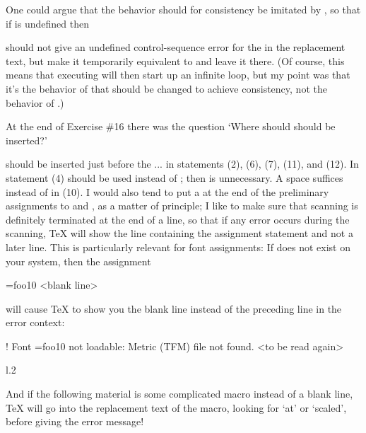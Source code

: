 One could argue that the \cmd{\chardef} behavior should for consistency be
imitated by \cmd{\edef}, \cmd{\xdef} so that if \cmd{\foo} is undefined then
\begin{lcode}
  \edef\foo{a\foo}
\end{lcode}
should not give an undefined control-sequence error for the \cmd{\foo} in the
replacement text, but make it temporarily equivalent to \cmd{\relax} and leave
it there.  (Of course, this means that executing \cmd{\foo} will then start up
an infinite loop, but my point was that it's the behavior of \cmd{\chardef}
that should be changed to achieve consistency, not the behavior of
\cmd{\edef}.)


At the end of Exercise \#16 there was the question `Where should \cmd{\relax}
should be inserted?'

\cmd{\relax} should be inserted just before the ... in statements (2), (6),
(7), (11), and (12). In statement (4) \cmd{\z@skip} should be used instead of
\cmd{\z@}; then \cmd{\relax} is unnecessary. A space suffices instead of \cmd{\relax} in
(10). I would also tend to put a \cmd{\relax} at the end of the preliminary
assignments to \cmd{\baselineskip} and \cmd{\lineskip}, as a matter of principle; I
like to make sure that scanning is definitely terminated at the end of a
line, so that if any error occurs during the scanning, TeX will show the
line containing the assignment statement and not a later line. This is
particularly relevant for font assignments: If  does not exist
on your system, then the assignment
\begin{lcode}
  \font\foo=foo10
  <blank line>
\end{lcode}
will cause TeX to show you the blank line instead of the preceding line
in the error context:
\begin{lcode}
  ! Font \foo=foo10 not loadable: Metric (TFM) file not found.
  <to be read again>
                     \par
  l.2
\end{lcode}
And if the following material is some complicated macro instead of a
blank line, TeX will go into the replacement text of the macro, looking
for `at' or `scaled', before giving the error message!

